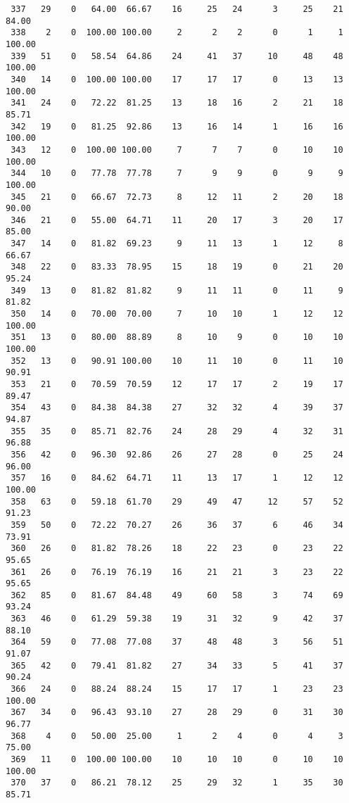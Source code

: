 \begin{verbatim}
 337   29    0   64.00  66.67    16     25   24      3     25    21    84.00
 338    2    0  100.00 100.00     2      2    2      0      1     1   100.00
 339   51    0   58.54  64.86    24     41   37     10     48    48   100.00
 340   14    0  100.00 100.00    17     17   17      0     13    13   100.00
 341   24    0   72.22  81.25    13     18   16      2     21    18    85.71
 342   19    0   81.25  92.86    13     16   14      1     16    16   100.00
 343   12    0  100.00 100.00     7      7    7      0     10    10   100.00
 344   10    0   77.78  77.78     7      9    9      0      9     9   100.00
 345   21    0   66.67  72.73     8     12   11      2     20    18    90.00
 346   21    0   55.00  64.71    11     20   17      3     20    17    85.00
 347   14    0   81.82  69.23     9     11   13      1     12     8    66.67
 348   22    0   83.33  78.95    15     18   19      0     21    20    95.24
 349   13    0   81.82  81.82     9     11   11      0     11     9    81.82
 350   14    0   70.00  70.00     7     10   10      1     12    12   100.00
 351   13    0   80.00  88.89     8     10    9      0     10    10   100.00
 352   13    0   90.91 100.00    10     11   10      0     11    10    90.91
 353   21    0   70.59  70.59    12     17   17      2     19    17    89.47
 354   43    0   84.38  84.38    27     32   32      4     39    37    94.87
 355   35    0   85.71  82.76    24     28   29      4     32    31    96.88
 356   42    0   96.30  92.86    26     27   28      0     25    24    96.00
 357   16    0   84.62  64.71    11     13   17      1     12    12   100.00
 358   63    0   59.18  61.70    29     49   47     12     57    52    91.23
 359   50    0   72.22  70.27    26     36   37      6     46    34    73.91
 360   26    0   81.82  78.26    18     22   23      0     23    22    95.65
 361   26    0   76.19  76.19    16     21   21      3     23    22    95.65
 362   85    0   81.67  84.48    49     60   58      3     74    69    93.24
 363   46    0   61.29  59.38    19     31   32      9     42    37    88.10
 364   59    0   77.08  77.08    37     48   48      3     56    51    91.07
 365   42    0   79.41  81.82    27     34   33      5     41    37    90.24
 366   24    0   88.24  88.24    15     17   17      1     23    23   100.00
 367   34    0   96.43  93.10    27     28   29      0     31    30    96.77
 368    4    0   50.00  25.00     1      2    4      0      4     3    75.00
 369   11    0  100.00 100.00    10     10   10      0     10    10   100.00
 370   37    0   86.21  78.12    25     29   32      1     35    30    85.71

\end{verbatim}
